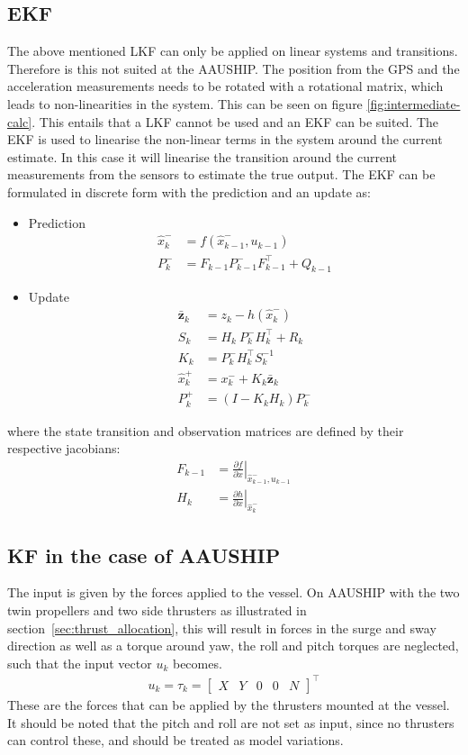 \subsection{\acl{EKF}}
The above mentioned \ac{LKF} can only be applied on linear systems and transitions. Therefore is this not suited at the AAUSHIP. The position from the \ac{GPS} and the acceleration measurements needs to be rotated with a rotational matrix, which leads to non-linearities in the system. This can be seen on figure \vref{fig:intermediate-calc}. This entails that a \ac{LKF} cannot be used and an \ac{EKF} can be suited. The \ac{EKF} is used to linearise the non-linear terms in the system around the current estimate. In this case it will linearise the transition around the current measurements from the sensors to estimate the true output. The \ac{EKF} can be formulated in discrete form with the prediction and an update as:
\begin{itemize}\tightlist
\item Prediction
\begin{align}
\hat x_k^- &= f(\hat x_{k-1}^-,u_{k-1})\\
P_k^- &= F_{k-1}P_{k-1}^-F_{k-1}^\top+Q_{k-1}
\end{align}
\item Update
\begin{align}
\bar{\mathbf{z}}_k &= z_k - h(\hat x_k^-)\\
S_k &= H_k\ P_k^-H_k^\top + R_k\\
K_k &= P_k^-H_k^\top S_k^{-1}\\
\hat x_k^+ &= x_k^- + K_k \bar{\mathbf{z}}_k\\
P_k^+ &= (I - K_k H_k) P_k^-
\end{align}
\end{itemize}
where the state transition and observation matrices are defined by their respective jacobians:
\begin{align}
F_{k-1} &= \left.\frac{\partial f}{\partial x}\right|_{\hat x_{k-1}^-,u_{k-1}} \label{eq:EKFF}\\
H_k &= \left.\frac{\partial h}{\partial x}\right|_{\hat x_{k}^-}
\end{align}

\subsection{\acl{KF} in the case of AAUSHIP}
\label{sec:kfonaauship}
The input is given by the forces applied to the vessel. On AAUSHIP with the two twin propellers and two side thrusters as illustrated in section~\vref{sec:thrust_allocation}, this will result in forces in the surge and sway direction as well as a torque around yaw, the roll and pitch torques are neglected, such that the input vector $u_k$ becomes.
\begin{align}
u_k = \tau_k =
\begin{bmatrix}
X & Y & 0 & 0 & N
\end{bmatrix}^\top
\end{align}
These are the forces that can be applied by the thrusters mounted at the vessel. It should be noted that the pitch and roll are not set as input, since no thrusters can control these, and should be treated as model variations.

